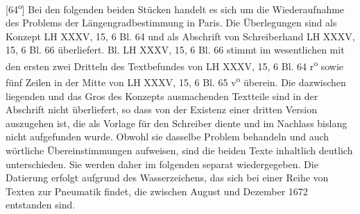 [64\textsuperscript{o}] Bei den folgenden beiden St\"{u}cken handelt es sich um die Wiederaufnahme des Problems der L\"{a}ngengradbestimmung in Paris. Die \"{U}berlegungen sind als Konzept LH XXXV, 15, 6 Bl. 64 und als Abschrift von Schreiberhand LH XXXV, 15, 6 Bl. 66 \"{u}berliefert. Bl. LH XXXV, 15, 6 Bl. 66 stimmt im wesentlichen mit den ersten zwei Dritteln des Textbefundes von LH XXXV, 15, 6 Bl. 64 r\textsuperscript{o} sowie f\"{u}nf Zeilen in der Mitte von LH XXXV, 15, 6 Bl. 65 v\textsuperscript{o} \"{u}berein. Die dazwischen liegenden und das Gros des Konzepts ausmachenden Textteile sind in der Abschrift nicht \"{u}berliefert, so dass von der Existenz einer dritten Version auszugehen ist, die als Vorlage f\"{u}r den Schreiber diente und im Nachlass bislang nicht aufgefunden wurde.  Obwohl sie dasselbe Problem behandeln und auch w\"{o}rtliche \"{U}bereinstimmungen aufweisen, sind die beiden Texte inhaltlich deutlich unterschieden. Sie werden daher im folgenden separat wiedergegeben. Die Datierung erfolgt aufgrund des Wasserzeichens, das sich bei einer Reihe von Texten zur Pneumatik findet, die zwischen August und Dezember 1672 entstanden sind.